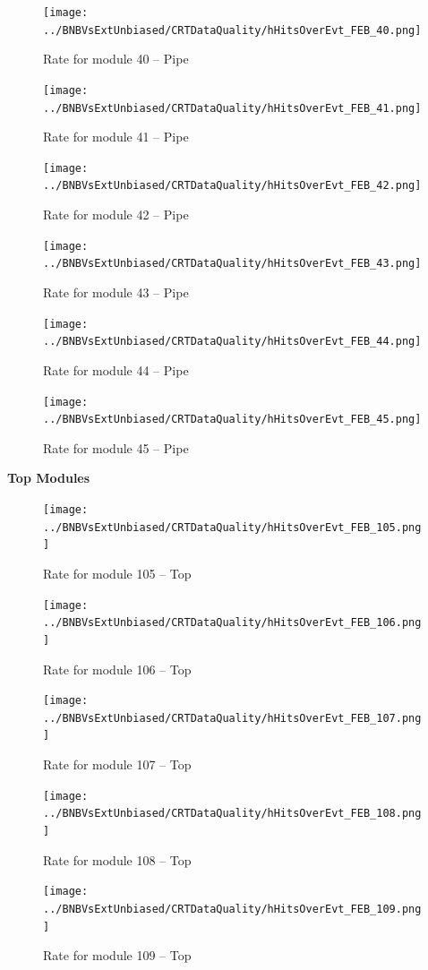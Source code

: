 \begin{figure}[h!]
\centering
\texttt{[image: ../BNBVsExtUnbiased/CRTDataQuality/hHitsOverEvt\_FEB\_40.png]}
\caption{Rate for module 40 -- Pipe}
\label{Annual40}
\end{figure}
\begin{figure}[h!]
\centering
\texttt{[image: ../BNBVsExtUnbiased/CRTDataQuality/hHitsOverEvt\_FEB\_41.png]}
\caption{Rate for module 41 -- Pipe}
\label{Annual41}
\end{figure}
\begin{figure}[h!]
\centering
\texttt{[image: ../BNBVsExtUnbiased/CRTDataQuality/hHitsOverEvt\_FEB\_42.png]}
\caption{Rate for module 42 -- Pipe}
\label{Annual42}
\end{figure}
\begin{figure}[h!]
\centering
\texttt{[image: ../BNBVsExtUnbiased/CRTDataQuality/hHitsOverEvt\_FEB\_43.png]}
\caption{Rate for module 43 -- Pipe}
\label{Annual43}
\end{figure}
\begin{figure}[h!]
\centering
\texttt{[image: ../BNBVsExtUnbiased/CRTDataQuality/hHitsOverEvt\_FEB\_44.png]}
\caption{Rate for module 44 -- Pipe}
\label{Annual44}
\end{figure}
\begin{figure}[h!]
\centering
\texttt{[image: ../BNBVsExtUnbiased/CRTDataQuality/hHitsOverEvt\_FEB\_45.png]}
\caption{Rate for module 45 -- Pipe}
\label{Annual45}
\end{figure}
\clearpage
{\bf Top Modules}
\begin{figure}[h!]
\centering
\texttt{[image: ../BNBVsExtUnbiased/CRTDataQuality/hHitsOverEvt\_FEB\_105.png]}
\caption{Rate for module 105 -- Top}
\label{Annual105}
\end{figure}
\begin{figure}[h!]
\centering
\texttt{[image: ../BNBVsExtUnbiased/CRTDataQuality/hHitsOverEvt\_FEB\_106.png]}
\caption{Rate for module 106 -- Top}
\label{Annual106}
\end{figure}
\begin{figure}[h!]
\centering
\texttt{[image: ../BNBVsExtUnbiased/CRTDataQuality/hHitsOverEvt\_FEB\_107.png]}
\caption{Rate for module 107 -- Top}
\label{Annual107}
\end{figure}
\begin{figure}[h!]
\centering
\texttt{[image: ../BNBVsExtUnbiased/CRTDataQuality/hHitsOverEvt\_FEB\_108.png]}
\caption{Rate for module 108 -- Top}
\label{Annual108}
\end{figure}
\begin{figure}[h!]
\centering
\texttt{[image: ../BNBVsExtUnbiased/CRTDataQuality/hHitsOverEvt\_FEB\_109.png]}
\caption{Rate for module 109 -- Top}
\label{Annual109}
\end{figure}
